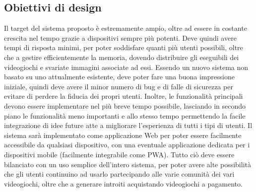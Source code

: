\subsection{Obiettivi di design}
Il target del sistema proposto è estremamente ampio, oltre ad essere in costante crescita nel tempo grazie a dispositivi sempre più potenti. Deve quindi avere tempi di risposta minimi, per poter soddisfare quanti più utenti possibili, oltre che a gestire efficientemente la memoria, dovendo distribuire gli eseguibili dei videogiochi e svariate immagini associate ad essi. Essendo un nuovo sistema non basato su uno attualmente esistente, deve poter fare una buona impressione iniziale, quindi deve avere il minor numero di bug e di falle di sicurezza per evitare di perdere la fiducia dei propri utenti. Inoltre, le funzionalità principali devono essere implementare nel più breve tempo possibile, lasciando in secondo piano le funzionalità meno importanti e allo stesso tempo permettendo la facile integrazione di idee future atte a migliorare l’esperienza di tutti i tipi di utenti. Il sistema sarà implementato come applicazione Web per poter essere facilmente accessibile da qualsiasi dispositivo, con una eventuale applicazione dedicata per i dispositivi mobile (facilmente integrabile come PWA). Tutto ciò deve essere bilanciato con un uso semplice dell’intero sistema, per poter avere alte possibilità che gli utenti continuino ad usarlo partecipando alle varie comunità dei vari videogiochi, oltre che a generare introiti acquistando videogiochi a pagamento.

